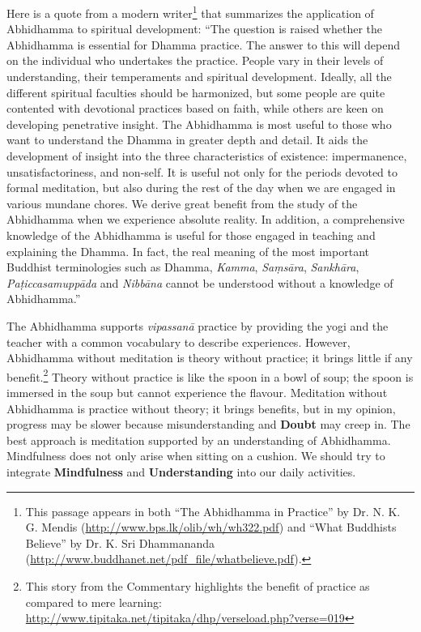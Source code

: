 Here is a quote from a modern writer\footnote{This passage appears in both “The Abhidhamma in Practice” by Dr. N. K. G. Mendis (\url{http://www.bps.lk/olib/wh/wh322.pdf}) and “What Buddhists Believe” by Dr. K. Sri Dhammananda (\url{http://www.buddhanet.net/pdf_file/whatbelieve.pdf}).} that summarizes the application of Abhidhamma to spiritual development: “The question is raised whether the Abhidhamma is essential for Dhamma practice. The answer to this will depend on the individual who undertakes the practice. People vary in their levels of understanding, their temperaments and spiritual development. Ideally, all the different spiritual faculties should be harmonized, but some people are quite contented with devotional practices based on faith, while others are keen on developing penetrative insight. The Abhidhamma is most useful to those who want to understand the Dhamma in greater depth and detail. It aids the development of insight into the three characteristics of existence: impermanence, unsatisfactoriness, and non-self. It is useful not only for the periods devoted to formal meditation, but also during the rest of the day when we are engaged in various mundane chores. We derive great benefit from the study of the Abhidhamma when we experience absolute reality. In addition, a comprehensive knowledge of the Abhidhamma is useful for those engaged in teaching and explaining the Dhamma. In fact, the real meaning of the most important Buddhist terminologies such as Dhamma, \textit{Kamma}, \textit{Saṃsāra}, \textit{Sankhāra}, \textit{Paṭiccasamuppāda} and \textit{Nibbāna} cannot be understood without a knowledge of Abhidhamma.”

The Abhidhamma supports \textit{vipassanā} practice by providing the yogi and the teacher with a common vocabulary to describe experiences. However, Abhidhamma without meditation is theory without practice; it brings little if any benefit.\footnote{This story from the Commentary highlights the benefit of practice as compared to mere learning: \url{http://www.tipitaka.net/tipitaka/dhp/verseload.php?verse=019}} Theory without practice is like the spoon in a bowl of soup; the spoon is immersed in the soup but cannot experience the flavour. Meditation without Abhidhamma is practice without theory; it brings benefits, but in my opinion, progress may be slower because misunderstanding and \textbf{Doubt} may creep in. The best approach is meditation supported by an understanding of Abhidhamma. Mindfulness does not only arise when sitting on a cushion. We should try to integrate \textbf{Mindfulness} and \textbf{Understanding} into our daily activities.


